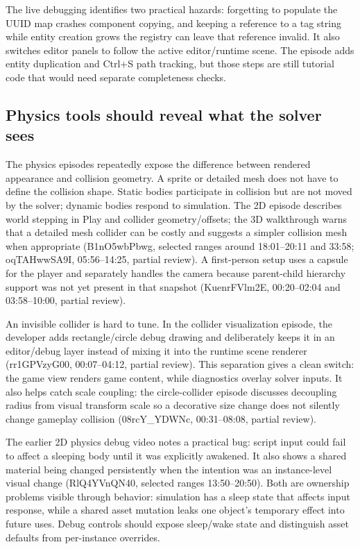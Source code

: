 The live debugging identifies two practical hazards: forgetting to populate the UUID map crashes component copying, and keeping a reference to a tag string while entity creation grows the registry can leave that reference invalid. It also switches editor panels to follow the active editor/runtime scene. The episode adds entity duplication and Ctrl+S path tracking, but those steps are still tutorial code that would need separate completeness checks.

\subsection{Physics tools should reveal what the solver sees}\label{06-engine-ii-ch033-physics-tools-should-reveal-what-the-solver-sees}

The physics episodes repeatedly expose the difference between rendered appearance and collision geometry. A sprite or detailed mesh does not have to define the collision shape. Static bodies participate in collision but are not moved by the solver; dynamic bodies respond to simulation. The 2D episode describes world stepping in Play and collider geometry/offsets; the 3D walkthrough warns that a detailed mesh collider can be costly and suggests a simpler collision mesh when appropriate (B1nO5wbPbwg, selected ranges around 18:01--20:11 and 33:58; oqTAHwwSA9I, 05:56--14:25, partial review). A first-person setup uses a capsule for the player and separately handles the camera because parent-child hierarchy support was not yet present in that snapshot (KuenrFVlm2E, 00:20--02:04 and 03:58--10:00, partial review).

An invisible collider is hard to tune. In the collider visualization episode, the developer adds rectangle/circle debug drawing and deliberately keeps it in an editor/debug layer instead of mixing it into the runtime scene renderer (rr1GPVzyG00, 00:07--04:12, partial review). This separation gives a clean switch: the game view renders game content, while diagnostics overlay solver inputs. It also helps catch scale coupling: the circle-collider episode discusses decoupling radius from visual transform scale so a decorative size change does not silently change gameplay collision (08rcY\_YDWNc, 00:31--08:08, partial review).

The earlier 2D physics debug video notes a practical bug: script input could fail to affect a sleeping body until it was explicitly awakened. It also shows a shared material being changed persistently when the intention was an instance-level visual change (RlQ4YVnQN40, selected ranges 13:50--20:50). Both are ownership problems visible through behavior: simulation has a sleep state that affects input response, while a shared asset mutation leaks one object's temporary effect into future uses. Debug controls should expose sleep/wake state and distinguish asset defaults from per-instance overrides.

